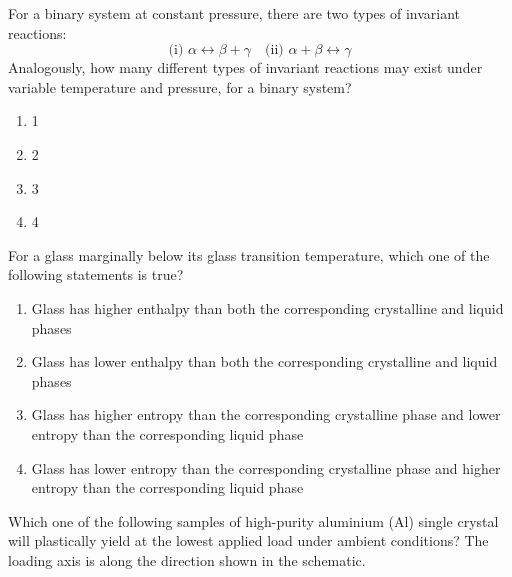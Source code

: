 \iffalse
\title{Assignment12}
\author{ee24btech11064}
\chapter{2022}
\section{xe}
\fi

    \item For a binary system at constant pressure, there are two types of invariant reactions:
    \[
    \text{(i) } \alpha \leftrightarrow \beta + \gamma \quad \text{(ii) } \alpha + \beta \leftrightarrow \gamma
    \]
    Analogously, how many different types of invariant reactions may exist under variable temperature and pressure, for a binary system?
    \begin{multicols}{2}
    \begin{enumerate}
            \item 1
            \item 2
             \item 3
            \item 4
    \end{enumerate}
    \end{multicols}
    \bigskip
\item For a glass marginally below its glass transition temperature, which one of the following statements is true?
\begin{enumerate}
        \item Glass has higher enthalpy than both the corresponding crystalline and liquid phases
        \item Glass has lower enthalpy than both the corresponding crystalline and liquid phases
        \item Glass has higher entropy than the corresponding crystalline phase and lower entropy than the corresponding liquid phase
        \item Glass has lower entropy than the corresponding crystalline phase and higher entropy than the corresponding liquid phase
\end{enumerate}
\bigskip
\item Which one of the following samples of high-purity aluminium (Al) single crystal will plastically yield at the lowest applied load under ambient conditions? The loading axis is along the direction shown in the schematic.

